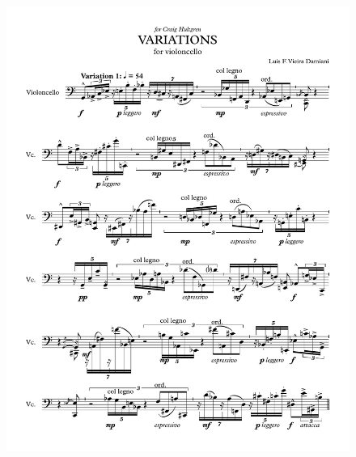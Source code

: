 \begin{figure}[h!]
    \centering
	\includegraphics[width=6.5in]{figures/Variations_1.pdf}
\end{figure}

